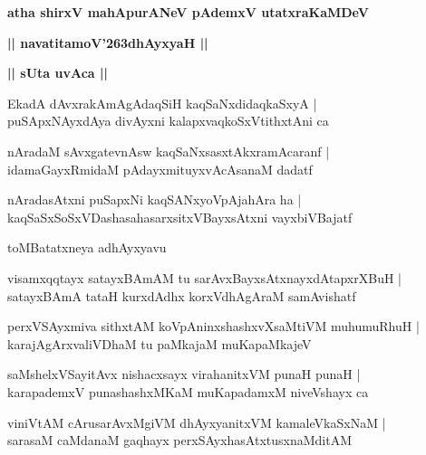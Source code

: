 \documentclass[twoside,12pt,openright]{book}
\def\S{\char'263}
\newcounter{shloka}[chapter]
\def\uvaca#1{\centerline{{\large\textbf{#1}}}}
\begin{document}
\begin{center}
{\LARGE\bfseries atha shirxV mahApurANeV pAdemxV utatxraKaMDeV}
\end{center}

\begin{center}
{\LARGE\bfseries || navatitamoV\S dhAyxyaH || }
\end{center}

\uvaca{|| sUta uvAca ||}

\begin{shloka}%
EkadA dAvxrakAmAgAdaqSiH kaqSaNxdidaqkaSxyA |\\
puSApxNAyxdAya divAyxni kalapxvaqkoSxVtithxtAni ca 
\end{shloka}

\begin{shloka}%
nAradaM sAvxgatevnAsw kaqSaNxsasxtAkxramAcaranf |\\
idamaGayxRmidaM pAdayxmituyxvAcAsanaM dadatf 
\end{shloka}

\begin{shloka}%
nAradasAtxni puSapxNi kaqSANxyoVpAjahAra ha |\\
kaqSaSxSoSxVDashasahasarxsitxVBayxsAtxni vayxbiVBajatf
\end{shloka}

\begin{center}
toMBatatxneya adhAyxyavu
\end{center}

\begin{shloka}%
visamxqqtayx satayxBAmAM tu sarAvxBayxsAtxnayxdAtapxrXBuH |\\
satayxBAmA tataH kurxdAdhx korxVdhAgAraM samAvishatf 
\end{shloka}

\begin{shloka}%
perxVSAyxmiva sithxtAM koVpAninxshashxvXsaMtiVM muhumuRhuH |\\
karajAgArxvaliVDhaM tu paMkajaM muKapaMkajeV 
\end{shloka}

\begin{shloka}%
saMshelxVSayitAvx nishacxsayx virahanitxVM punaH punaH |\\
karapademxV punashashxMKaM muKapadamxM niveVshayx ca 
\end{shloka}

\begin{shloka}%
viniVtAM cArusarAvxMgiVM dhAyxyanitxVM kamaleVkaSxNaM |\\
sarasaM caMdanaM gaqhayx perxSAyxhasAtxtusxnaMditAM 
\end{shloka}
\end{document}
